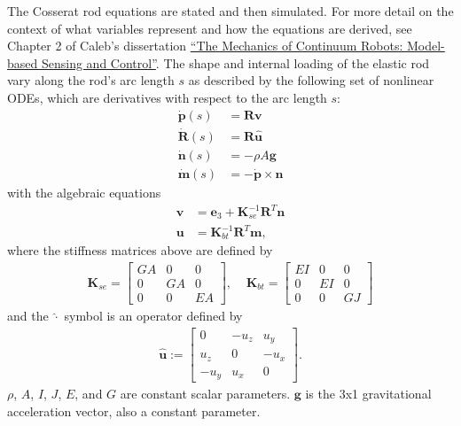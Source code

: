 \documentclass[12pt]{article}
\begin{document}
\makeatletter
\renewcommand{\@maketitle}{
\newpage
\null
\vskip 2em
\begin{center}
{\LARGE \@title \par}
\end{center}
\par
} \makeatother

\maketitle

The Cosserat rod equations are stated and then simulated. For more detail on the context of what variables represent and how the equations are derived, see Chapter 2 of Caleb's dissertation \href{https://etd.library.vanderbilt.edu//available/etd-10042011-115347/}{``The Mechanics of Continuum Robots: Model-based Sensing and Control''}. The shape and internal loading of the elastic rod vary along the rod's arc length $s$ as described by the following set of nonlinear ODEs, which are derivatives with respect to the arc length $s$:
\begin{align*}
\dot{\boldsymbol{p}}(s) &= \boldsymbol{R} \boldsymbol{v} \\
\dot{\boldsymbol{R}}(s) &= \boldsymbol{R} \widehat{\boldsymbol{u}} \\
\dot{\boldsymbol{n}}(s) &= -\rho A \boldsymbol{g} \\
\dot{\boldsymbol{m}}(s) &= - \dot{\boldsymbol{p}} \times \boldsymbol{n}
\end{align*}
with the algebraic equations
\begin{align*}
\boldsymbol{v} &= \boldsymbol{e}_3 + \boldsymbol{K}_{se}^{-1} \boldsymbol{R}^T \boldsymbol{n} \\
\boldsymbol{u} &= \boldsymbol{K}_{bt}^{-1} \boldsymbol{R}^T \boldsymbol{m},
\end{align*}
where the stiffness matrices above are defined by
\begin{align*}
\boldsymbol{K}_{se} = \begin{bmatrix} GA & 0 & 0 \\ 0 & GA & 0 \\ 0 & 0 & EA \end{bmatrix}, \;\;\;\;
\boldsymbol{K}_{bt} = \begin{bmatrix} EI & 0 & 0 \\ 0 & EI & 0 \\ 0 & 0 & GJ \end{bmatrix}
\end{align*}
and the $\widehat{\cdot}$ symbol is an operator defined by
\begin{align*}
\widehat{\boldsymbol{u}} := \begin{bmatrix} 0 & -u_z & u_y \\ u_z & 0 & -u_x \\ -u_y & u_x & 0 \end{bmatrix}.
\end{align*}
$\rho$, $A$, $I$, $J$, $E$, and $G$ are constant scalar parameters. $\boldsymbol{g}$ is the 3x1 gravitational acceleration vector, also a constant parameter.
\end{document}
